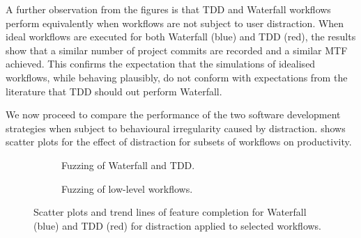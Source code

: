 \documentclass{llncs}
\begin{document}
A further observation from the figures is that TDD and Waterfall workflows perform equivalently when workflows are not
subject to user distraction.  When ideal workflows are executed for both Waterfall (blue) and TDD (red), the results
show that a similar number of project commits are recorded and a similar MTF achieved.  This confirms the expectation
that the simulations of idealised workflows, while behaving plausibly, do not conform with expectations from the
literature that TDD should out perform Waterfall.

We now proceed to compare the performance of the two software development
strategies when subject to behavioural irregularity
caused by distraction.  shows scatter plots for the effect of distraction for
subsets of workflows on productivity.%
\begin{figure}[t]
  \centering
  \hfill
  \begin{subfigure}[t]{2.3in}%
    \caption{Fuzzing of Waterfall and TDD.}
    \label{fig:fuzzing-features:WF}
  \end{subfigure}
  \hfill
  \begin{subfigure}[t]{2.3in}
    \caption{Fuzzing of low-level workflows.}  
  \label{fig:fuzzing-features:CTIDR}
  \end{subfigure}
  \hfill

  \caption{Scatter plots and trend lines of feature completion for Waterfall (blue) and TDD (red) for distraction
    applied to selected workflows.}
  \label{fig:fuzzing-features}
\end{figure}
\end{document}
